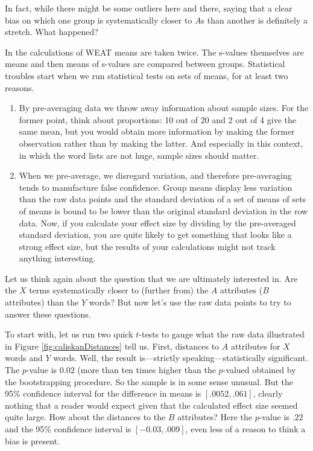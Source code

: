 \documentclass{clv3}
\begin{document}
\noindent In fact, while there might be some outliers here and there,
saying that a clear bias on which one group is systematically closer to
\(A\)s than another is definitely a stretch. What happened?

In the calculations of \textsf{WEAT} means are taken twice. The
\textsf{s}-values themselves are means and then means of
\textsf{s}-values are compared between groups. Statistical troubles
start when we run statistical tests on sets of means, for at least two
reasons.

\begin{enumerate}

\item By pre-averaging data we throw away information about sample sizes. For the former point, think about proportions: 10 out of 20 and 2 out of 4 give the same mean, but you would obtain more information by making the former observation rather than by making the latter.  And especially in this context, in which the word lists are not huge, sample sizes should matter.

\item When we pre-average, we disregard variation, and therefore pre-averaging  tends to manufacture false confidence. Group means display less variation than the raw data points and the standard deviation of a set of means of sets of means is bound to be lower than the original standard deviation in the row data. Now, if you calculate your effect size by dividing by the pre-averaged standard deviation, you are quite likely to get something that looks like a strong effect size, but the results of your calculations might not track anything interesting.
\end{enumerate}

Let us think again about the question that we are ultimately interested
in. Are the \(X\) terms systematically closer to (further from) the
\(A\) attributes (\(B\) attributes) than the \(Y\) words? But now let's
use the raw data points to try to answer these questions.

To start with, let us run two quick \(t\)-tests to gauge what the raw
data illustrated in Figure \ref{fig:caliskanDistances} tell us. First,
distances to \(A\) attributes for \(X\) words and \(Y\) words. Well, the
result is---strictly speaking---statistically significant. The
\(p\)-value is \(0.02\) (more than ten times higher than the
\(p\)-valued obtained by the bootstrapping procedure. So the sample is
in some sense unusual. But the 95\% confidence interval for the
difference in means is \([.0052, .061]\), clearly nothing that a reader
would expect given that the calculated effect size seemed quite large.
How about the distances to the \(B\) attributes? Here the \(p\)-value is
\(.22\) and the 95\% confidence interval is \([-0.03, .009]\), even less
of a reason to think a bias is present.
\end{document}
